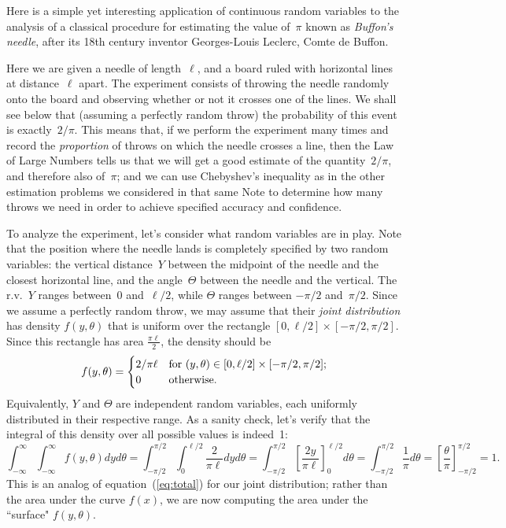 \documentclass[11pt]{article}
\begin{document}
Here is a simple yet interesting application of continuous random variables to the analysis
of a classical procedure for estimating the value of~$\pi$ known as {\it Buffon's
needle}, after its 18th century inventor Georges-Louis Leclerc, Comte de Buffon.

Here we are given a needle of length~$\ell$, and a board ruled with
horizontal lines at distance~$\ell$ apart.  The experiment consists
of throwing the needle randomly onto the board and observing whether
or not it crosses one of the lines. We shall see below that
(assuming a perfectly random throw) the probability of this event is
exactly~$2/\pi$.  This means that, if we perform the experiment many
times and record the {\it proportion\/} of throws on which the
needle crosses a line, then the Law of Large Numbers
tells us that we will get a good estimate of the quantity~$2/\pi$,
and therefore also of~$\pi$; and we can use Chebyshev's inequality
as in the other estimation problems we considered in that same Note 
to determine how many throws we need in order 
to achieve specified accuracy and confidence.

To analyze the experiment, let's consider what random variables are in play.  Note that the
position where the needle lands is completely specified by two
random variables: the vertical distance~$Y$ between the midpoint of
the needle and the closest horizontal line, and the angle~$\Theta$
between the needle and the vertical.  The r.v.~$Y$ ranges between~0
and~$\ell/2$, while $\Theta$ ranges between $-\pi/2$  and~$\pi/2$.
Since we assume a perfectly random throw, we may assume that their
{\it joint distribution\/} has density $f(y,\theta)$ that is uniform
over the rectangle $[0,\ell/2]\times[-\pi/2,\pi/2]$. Since this
rectangle has area $\frac{\pi\ell}{2}$, the density should be
\begin{equation}\label{eq:ytheta}
   f(y,\theta) = \begin{cases}
       2/\pi\ell & \hbox{\rm for $(y,\theta)\in [0,\ell/2]\times[-\pi/2,\pi/2]$;}\cr
       0 & \hbox{\rm otherwise}.\cr
   \end{cases}
\end{equation}
Equivalently, $Y$ and $\Theta$ are independent random variables, each uniformly distributed in their respective range.
As a sanity check, let's verify that the integral of this density over all possible
values is indeed~1:  $$
   \int_{-\infty}^\infty \int_{-\infty}^\infty f(y,\theta) dy d\theta
        = \int_{-\pi/2}^{\pi/2}\int_0^{\ell/2} \frac{2}{\pi\ell} dyd\theta
        = \int_{-\pi/2}^{\pi/2} \left[\frac{2y}{\pi\ell}\right]_0^{\ell/2} d\theta
        = \int_{-\pi/2}^{\pi/2} \frac{1}{\pi} d\theta
        = \left[\frac{\theta}{\pi}\right]_{-\pi/2}^{\pi/2}
        = 1.  $$
This is an analog of equation~(\ref{eq:total}) for our joint distribution; rather than
the area under the curve $f(x)$, we are now computing the area under the
``surface" $f(y,\theta)$. 
\end{document}
